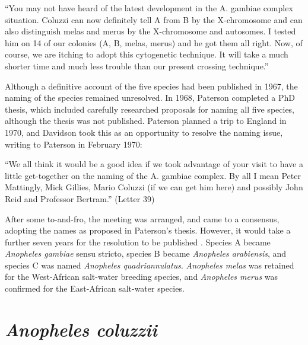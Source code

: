 \documentclass[a4paper,11pt,abstracton,hidelinks]{scrartcl}
\begin{document}
\begin{displayquote}
``You may not have heard of the latest development in the A. gambiae complex situation. Coluzzi can now definitely tell A from B by the X-chromosome and can also distinguish melas and merus by the X-chromosome and autosomes. I tested him on 14 of our colonies (A, B, melas, merus) and he got them all right. Now, of course, we are itching to adopt this cytogenetic technique. It will take a much shorter time and much less trouble than our present crossing technique.''
\end{displayquote}


Although a definitive account of the five species had been published in 1967, the naming of the species remained unresolved. In 1968, Paterson completed a PhD thesis, which included carefully researched proposals for naming all five species, although the thesis was not published. Paterson planned a trip to England in 1970, and Davidson took this as an opportunity to resolve the naming issue, writing to Paterson in February 1970:


\begin{displayquote}
``We all think it would be a good idea if we took advantage of your visit to have a little get-together on the naming of the A. gambiae complex. By all I mean Peter Mattingly, Mick Gillies, Mario Coluzzi (if we can get him here) and possibly John Reid and Professor Bertram.'' (Letter 39)
\end{displayquote}


After some to-and-fro, the meeting was arranged, and came to a consensus, adopting the names as proposed in Paterson's thesis. However, it would take a further seven years for the resolution to be published \citep{Mattingly1977}. Species A became \textit{Anopheles gambiae} sensu stricto, species B became \textit{Anopheles arabiensis}, and species C was named \textit{Anopheles quadriannulatus}. \textit{Anopheles melas} was retained for the West-African salt-water breeding species, and \textit{Anopheles merus} was confirmed for the East-African salt-water species.


\section{\textit{Anopheles coluzzii}}
\end{document}
